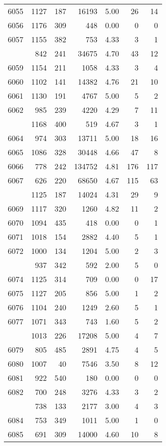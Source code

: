 \documentclass[
]{article}
\begin{document}
\begin{table}
\begin{tabular}[t]{lrrrrrr}
6055 & 1127 & 187 & 16193 & 5.00 & 26 & 14\\
6056 & 1176 & 309 & 448 & 0.00 & 0 & 0\\
6057 & 1155 & 382 & 753 & 4.33 & 3 & 1\\
\addlinespace
6058 & 842 & 241 & 34675 & 4.70 & 43 & 12\\
6059 & 1154 & 211 & 1058 & 4.33 & 3 & 4\\
6060 & 1102 & 141 & 14382 & 4.76 & 21 & 10\\
6061 & 1130 & 191 & 4767 & 5.00 & 5 & 2\\
6062 & 985 & 239 & 4220 & 4.29 & 7 & 11\\
\addlinespace
6063 & 1168 & 400 & 519 & 4.67 & 3 & 1\\
6064 & 974 & 303 & 13711 & 5.00 & 18 & 16\\
6065 & 1086 & 328 & 30448 & 4.66 & 47 & 8\\
6066 & 778 & 242 & 134752 & 4.81 & 176 & 117\\
6067 & 626 & 220 & 68650 & 4.67 & 115 & 63\\
\addlinespace
6068 & 1125 & 187 & 14024 & 4.31 & 29 & 9\\
6069 & 1117 & 320 & 1260 & 4.82 & 11 & 2\\
6070 & 1094 & 435 & 418 & 0.00 & 0 & 1\\
6071 & 1018 & 154 & 2882 & 4.40 & 5 & 1\\
6072 & 1000 & 134 & 1204 & 5.00 & 2 & 3\\
\addlinespace
6073 & 937 & 342 & 592 & 2.00 & 5 & 0\\
6074 & 1125 & 314 & 709 & 0.00 & 0 & 17\\
6075 & 1127 & 205 & 856 & 5.00 & 1 & 2\\
6076 & 1104 & 240 & 1249 & 2.60 & 5 & 1\\
6077 & 1071 & 343 & 743 & 1.60 & 5 & 2\\
\addlinespace
6078 & 1013 & 226 & 17208 & 5.00 & 4 & 7\\
6079 & 805 & 485 & 2891 & 4.75 & 4 & 5\\
6080 & 1007 & 40 & 7546 & 3.50 & 8 & 12\\
6081 & 922 & 540 & 180 & 0.00 & 0 & 0\\
6082 & 700 & 248 & 3276 & 4.33 & 3 & 2\\
\addlinespace
6083 & 738 & 133 & 2177 & 3.00 & 4 & 3\\
6084 & 753 & 349 & 1011 & 5.00 & 1 & 0\\
6085 & 691 & 309 & 14000 & 4.60 & 10 & 8\\

\end{tabular}
\end{table}
\end{document}
